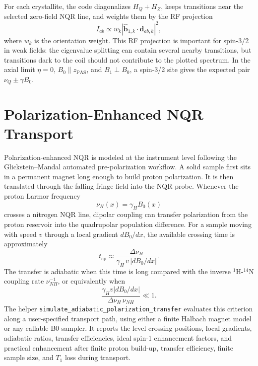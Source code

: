 \documentclass[11pt,oneside]{report}
\newcommand{\code}[1]{\texttt{#1}}
\begin{document}
For each crystallite, the code diagonalizes \(H_Q+H_Z\), keeps transitions
near the selected zero-field NQR line, and weights them by the RF projection
\[
  I_{ab} \propto w_k
  \left|\hat{\mathbf{b}}_{1,k}\cdot\mathbf{d}_{ab,k}\right|^2,
\]
where \(w_k\) is the orientation weight. This RF projection is important for
spin-3/2 in weak fields: the eigenvalue splitting can contain several nearby
transitions, but transitions dark to the coil should not contribute to the
plotted spectrum. In the axial limit \(\eta=0\), \(B_0\parallel z_{\mathrm{PAS}}\),
and \(B_1\perp B_0\), a spin-3/2 site gives the expected pair
\(\nu_Q\pm\gamma B_0\).

\section{Polarization-Enhanced NQR Transport}
\label{sec:nqr-polarization-enhancement}

Polarization-enhanced NQR is modeled at the instrument level following the
Glickstein--Mandal automated pre-polarization workflow. A solid sample first
sits in a permanent magnet long enough to build proton polarization. It is then
translated through the falling fringe field into the NQR probe. Whenever the
proton Larmor frequency
\[
  \nu_H(x) = \gamma_H B_0(x)
\]
crosses a nitrogen NQR line, dipolar coupling can transfer polarization from
the proton reservoir into the quadrupolar population difference. For a sample
moving with speed \(v\) through a local gradient \(dB_0/dx\), the available
crossing time is approximately
\[
  t_{\mathrm{cp}} \approx
  \frac{\Delta\nu_H}{\gamma_H\,v\,|dB_0/dx|}.
\]
The transfer is adiabatic when this time is long compared with the inverse
\({}^{1}\mathrm{H}\)-\({}^{14}\mathrm{N}\) coupling rate \(\nu_{NH}^{-1}\), or
equivalently when
\[
  \frac{\gamma_H v |dB_0/dx|}
       {\Delta\nu_H\,\nu_{NH}} \ll 1.
\]
The helper \code{simulate\_adiabatic\_polarization\_transfer} evaluates this
criterion along a user-specified transport path, using either a finite Halbach
magnet model or any callable B0 sampler. It reports the level-crossing
positions, local gradients, adiabatic ratios, transfer efficiencies, ideal
spin-1 enhancement factors, and practical enhancement after finite proton
build-up, transfer efficiency, finite sample size, and \(T_1\) loss during
transport.
\end{document}

